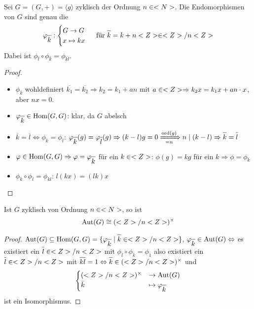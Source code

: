 \begin{lemma}
	Sei $G=(G,+) = \langle g\rangle$ zyklisch der Ordnung $n \in <N>$. Die Endomorphismen von $G$ sind genau die 
	\begin{align}
		\phi_{\overline{k}}: \begin{cases}
		G \to G \\
		x \mapsto kx
		\end{cases} \text{ für } \overline{k} = k + n\whole \in \whole/n\whole\notag
	\end{align}
	Dabei ist $\phi_{\overline{l}}\circ\phi_{\overline{k}} = \phi_{\overline{kl}}$.
\end{lemma}
\begin{proof}
	\begin{itemize}
		\item $\phi_{\overline{k}}$ wohldefiniert $\overline{k_1} = \overline{k_2} \Rightarrow k_2 = k_1 +an$ mit $a \in <Z>\Rightarrow k_2 x = k_1 x + a n \cdot x$, aber $nx=0$.
		\item $\phi_{\overline{k}} \in \Hom(G,G)$: klar, da $G$ abelsch
		\item $\overline{k}=\overline{l}\Leftrightarrow \phi_{\overline{k}} = \phi_{\overline{l}}$: $\phi_{\overline{k}}(g) = \phi_{\overline{l}}(g) \Rightarrow (k-l)g = 0 \xRightarrow[=n]{\ord(g)} n \mid (k-l) \Rightarrow \overline{k} = \overline{l}$
		\item $\phi \in \Hom(G,G) \Rightarrow \phi = \phi_{\overline{k}}$ für ein $k \in <Z>$: $\phi(g) = kg$ für ein $k \Rightarrow \phi = \phi_{\overline{k}}$
		\item $\phi_{\overline{k}} \circ \phi_{\overline{l}} = \phi_{\overline{kl}}$: $l(kx) = (lk)x$
	\end{itemize}
\end{proof}

\begin{proposition}
	Ist $G$ zyklisch von Ordnung $n \in <N>$, so ist
	\begin{align}
		\operatorname{Aut}(G) \cong (<Z>/n<Z>)^{\times}\notag
	\end{align}
\end{proposition}
\begin{proof}
	$\Aut(G) \subseteq \Hom(G,G) = \{ \phi_{\overline{k}} \mid \overline{k} \in \whole/n\whole\}$, $\phi_{\overline{k}}\in\Aut(G)\Leftrightarrow$ es existiert ein $\overline{l}\in\whole/n\whole$ mit $\phi_{\overline{l}}\circ\phi_{\overline{k}}=\phi_{\overline{1}}$ also existiert ein $\overline{l}\in\whole/n\whole$ mit $\overline{kl}=1\Leftrightarrow\overline{k}\in (\whole/n\whole)^\times$ und 
	\begin{align}
		\begin{cases}
		(\whole/n\whole)^\times&\to \Aut(G) \\
		\overline{k}&\mapsto \phi_{\overline{k}}
		\end{cases}\notag
	\end{align}
	ist ein Isomorphismus.
\end{proof}


